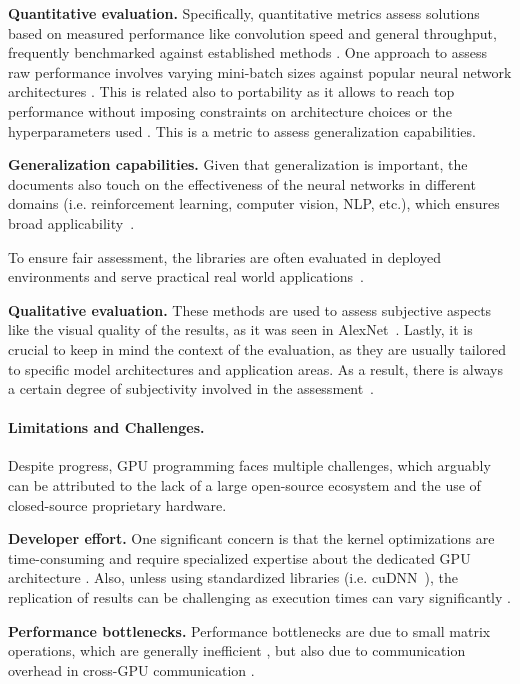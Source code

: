 \textbf{Quantitative evaluation.}
Specifically, quantitative metrics assess solutions based on measured performance like convolution speed
and general throughput, frequently benchmarked against established methods .
One approach to assess raw performance involves varying mini-batch sizes against popular neural network
architectures . This is related also to portability as it allows to reach top
performance without imposing constraints on architecture choices or the hyperparameters used
. This is a metric to assess generalization capabilities.

\textbf{Generalization capabilities.}
Given that generalization is important, the documents also touch on the effectiveness of the neural
networks in different domains (i.e. reinforcement learning, computer vision, NLP, etc.), which
ensures broad applicability~.

To ensure fair assessment, the libraries are often evaluated in deployed environments and serve
practical real world applications~.

\textbf{Qualitative evaluation.}
These methods are used to assess subjective aspects like the visual quality of the results, as it was
seen in AlexNet~. Lastly, it is crucial to keep in mind the context of the evaluation,
as they are usually tailored to specific model architectures and application areas. As a result,
there is always a certain degree of subjectivity involved in the assessment~.

\paragraph{Limitations and Challenges.}
Despite progress, GPU programming faces multiple challenges, which arguably can be attributed to
the lack of a large open-source ecosystem and the use of closed-source proprietary hardware.

\textbf{Developer effort.}
One significant concern is that the kernel optimizations are time-consuming and require specialized
expertise about the dedicated GPU architecture . Also, unless using standardized
libraries (i.e. cuDNN~\cite{chetlur_cudnn_2014}), the replication of results can be challenging as
execution times can vary significantly .

\textbf{Performance bottlenecks.}
Performance bottlenecks are due to small matrix operations, which are generally inefficient ,
but also due to communication overhead in cross-GPU communication .

